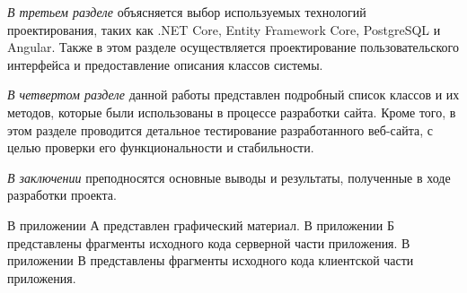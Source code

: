 \emph{В третьем разделе} объясняется выбор используемых технологий проектирования, таких как .NET Core, Entity Framework Core, PostgreSQL и Angular. Также в этом разделе осуществляется проектирование пользовательского интерфейса и предоставление описания классов системы.

\emph{В четвертом разделе} данной работы представлен подробный список классов и их методов, которые были использованы в процессе разработки сайта. Кроме того, в этом разделе проводится детальное тестирование разработанного веб-сайта, с целью проверки его функциональности и стабильности.

\emph{В заключении} преподносятся основные выводы и результаты, полученные в ходе разработки проекта.

В приложении А представлен графический материал.
В приложении Б представлены фрагменты исходного кода серверной части приложения. 
В приложении В представлены фрагменты исходного кода клиентской части приложения. 
